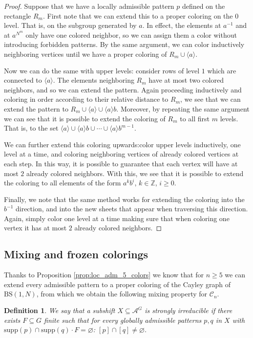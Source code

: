 \documentclass[cupthm,crop,info]{CUP-JNL-ETS}%
\theoremstyle{cupplain}
\theoremstyle{cupdefinition}
\newtheorem{definition}{Definition}[section]
\theoremstyle{cupremark}
\theoremstyle{cupproof}
\newtheorem{proof}{Proof}
\numberwithin{equation}{section}
\newcommand{\BS}[1][N]{\mathrm{BS}(1,#1)}
\begin{document}
\begin{proof}
Suppose that we have a locally admissible pattern $p$ defined on the rectangle $R_{m}$. First note that we can extend this to a proper coloring on the $0$ level. That is, on the subgroup generated by $a$. In effect, the elements at $a^{-1}$ and at $a^{N^m}$ only have one colored neighbor, so we can assign them a color without introducing forbidden patterns. By the same argument, we can color inductively neighboring vertices until we have a proper coloring of $R_m\cup \langle a \rangle$.

Now we can do the same with upper levels: consider rows of level $1$ which are connected to $\langle a\rangle$. The elements neighboring $R_m$ have at most two colored neighbors, and so we can extend the pattern. Again proceeding inductively and coloring in order according to their relative distance to $R_m$, we see that we can extend the pattern to $R_m\cup \langle a\rangle \cup \langle a\rangle b$. Moreover, by repeating the same argument we can see that it is possible to extend the coloring of $R_m$ to all first $m$ levels. That is, to the set $\langle a\rangle \cup \langle a\rangle b \cup \cdots \cup \langle a\rangle b^{m-1} .$

We can further extend this coloring upwards:color upper levels inductively, one level at a time, and coloring neighboring vertices of already colored vertices at each step. In this way, it is possible to guarantee that each vertex will have at most $2$ already colored neighbors. With this, we see that it is possible to extend the coloring to all elements of the form $a^kb^i$, $k\in \mathbb{Z}$, $i\ge 0$.

Finally, we note that the same method works for extending the coloring into the $b^{-1}$ direction, and into the new sheets that appear when traversing this direction. Again, simply color one level at a time making sure that when coloring one vertex it has at most $2$ already colored neighbors.
\end{proof}


\subsection{Mixing and frozen colorings}\label{subsection:mixing_and frozen}
Thanks to Proposition \ref{prop:loc_adm_5_colors} we know that for $n\ge 5$ we can extend every admissible pattern to a proper coloring of the Cayley graph of $\BS$, from which we obtain the following mixing property for $\mathcal{C}_n$.
\begin{definition} We say that a subshift $X\subseteq \mathcal{A}^G$ is \textit{strongly irreducible} if there exists $F\subseteq G$ finite such that for every globally admissible patterns $p,q$ in $X$ with $\mathrm{supp}(p)\cap \mathrm{supp}(q)\cdot F=\varnothing$: $[p]\cap [q]\neq \varnothing$.
\end{definition}
\end{document}
